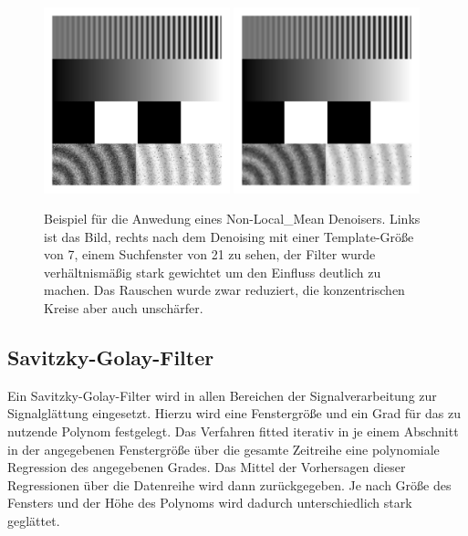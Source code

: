 \documentclass[
  12pt,
  openany]{book}
\begin{document}
\begin{figure}

{\centering \includegraphics[width=0.48\textwidth]{../imgs/geometric} \includegraphics[width=0.48\textwidth]{../imgs/nlMean_30_7_21} 

}

\caption[Beispiel für die Anwedung eines Non-Local\_Mean Denoisers.]{Beispiel für die Anwedung eines Non-Local\_Mean Denoisers. Links ist das Bild, rechts nach dem Denoising mit einer Template-Größe von 7, einem Suchfenster von 21 zu sehen, der Filter wurde verhältnismäßig stark gewichtet um den Einfluss deutlich zu machen. Das Rauschen wurde zwar reduziert, die konzentrischen Kreise aber auch unschärfer.}\label{fig:nlMeans}
\end{figure}

\hypertarget{savitzky-golay-filter}{%
\subsection{Savitzky-Golay-Filter}\label{savitzky-golay-filter}}

Ein Savitzky-Golay-Filter wird in allen Bereichen der Signalverarbeitung zur Signalglättung eingesetzt. Hierzu wird eine Fenstergröße und ein Grad für das zu nutzende Polynom festgelegt. Das Verfahren fitted iterativ in je einem Abschnitt in der angegebenen Fenstergröße über die gesamte Zeitreihe eine polynomiale Regression des angegebenen Grades. Das Mittel der Vorhersagen dieser Regressionen über die Datenreihe wird dann zurückgegeben. Je nach Größe des Fensters und der Höhe des Polynoms wird dadurch unterschiedlich stark geglättet.
\end{document}
